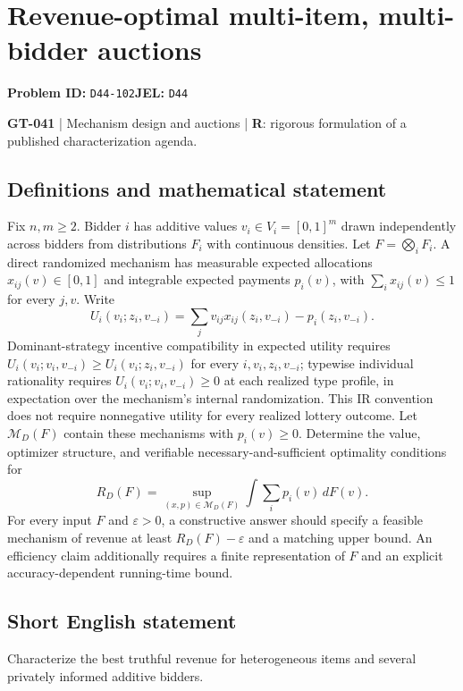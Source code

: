 \documentclass[11pt,a4paper]{article}
\begin{document}
\section*{Revenue-optimal multi-item, multi-bidder auctions}
\textbf{Problem ID:} \texttt{D44-102}\quad \textbf{JEL:} \texttt{D44}\par
\label{problem:OP-0171}
\label{game:GT-041}
{\sffamily\small\color{muted}
\textbf{GT-041} | Mechanism design and auctions | \textbf{R}: rigorous formulation of a published characterization agenda.
\par}
\subsection*{Definitions and mathematical statement}
Fix $n,m\geq2$. Bidder $i$ has additive values $v_i\in V_i=[0,1]^m$ drawn independently across bidders from distributions $F_i$ with continuous densities. Let $F=\bigotimes_i F_i$. A direct randomized mechanism has measurable expected allocations $x_{ij}(v)\in[0,1]$ and integrable expected payments $p_i(v)$, with $\sum_i x_{ij}(v)\leq1$ for every $j,v$. Write
\[
 U_i(v_i;z_i,v_{-i})=\sum_j v_{ij}x_{ij}(z_i,v_{-i})-p_i(z_i,v_{-i}).
\]
Dominant-strategy incentive compatibility in expected utility requires $U_i(v_i;v_i,v_{-i})\geq U_i(v_i;z_i,v_{-i})$ for every $i,v_i,z_i,v_{-i}$; typewise individual rationality requires $U_i(v_i;v_i,v_{-i})\geq0$ at each realized type profile, in expectation over the mechanism's internal randomization. This IR convention does not require nonnegative utility for every realized lottery outcome. Let $\mathcal M_D(F)$ contain these mechanisms with $p_i(v)\geq0$. Determine the value, optimizer structure, and verifiable necessary-and-sufficient optimality conditions for
\[
 R_D(F)=\sup_{(x,p)\in\mathcal M_D(F)}\int \sum_i p_i(v)\,dF(v).
\]
For every input $F$ and $\varepsilon>0$, a constructive answer should specify a feasible mechanism of revenue at least $R_D(F)-\varepsilon$ and a matching upper bound. An efficiency claim additionally requires a finite representation of $F$ and an explicit accuracy-dependent running-time bound.
\subsection*{Short English statement}
Characterize the best truthful revenue for heterogeneous items and several privately informed additive bidders.
\end{document}
